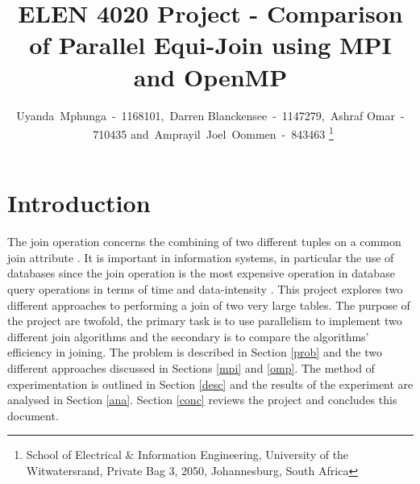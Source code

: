 \documentclass[journal,draftclsnofoot]{IEEEtran}
\begin{document}
\title{ELEN 4020 Project - Comparison of Parallel Equi-Join using MPI and OpenMP}
\author{Uyanda~Mphunga~-~1168101,~Darren Blanckensee~-~1147279,~Ashraf Omar~-~710435 and~Amprayil~Joel~Oommen~-~843463
\thanks{School of Electrical \& Information Engineering, University of the
Witwatersrand, Private Bag 3, 2050, Johannesburg, South Africa}
}
\maketitle
\pagestyle{plain}
\begin{abstract}

\end{abstract}
\section{Introduction}
The join operation concerns the combining of two different tuples on a common join attribute \cite{Yu1998}. It is important in information systems, in particular the use of databases since the join operation is the most expensive operation in database query operations in terms of time and data-intensity \cite{Mishra1992}. This project explores two different approaches to performing a join of two very large tables. The purpose of the project are twofold, the primary task is to use parallelism to implement two different join algorithms and the secondary is to compare the algorithms’ efficiency in joining. The problem is described in Section \ref{prob} and the two different approaches discussed in Sections \ref{mpi} and \ref{omp}. The method of experimentation is outlined in Section \ref{desc} and the results of the experiment are analysed in Section \ref{ana}. Section \ref{conc} reviews the project and concludes this document.
\end{document}
